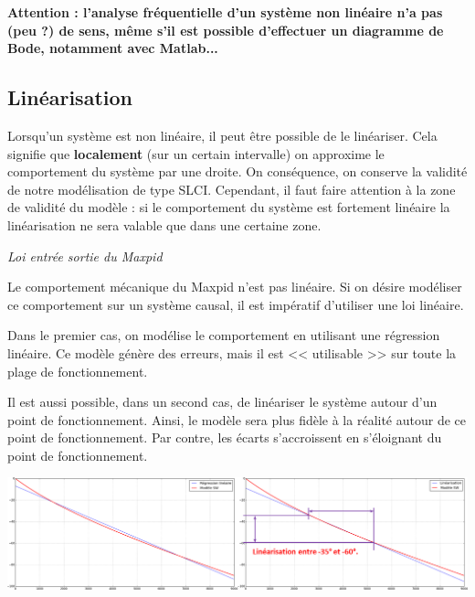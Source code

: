 \documentclass[10pt,fleqn]{article} %
\begin{document}
\textbf{Attention : l'analyse fréquentielle d'un système non linéaire n'a pas (peu ?) de sens, même s'il est possible d'effectuer un diagramme de Bode, notamment avec Matlab...}

\subsection{Linéarisation}
Lorsqu'un système est non linéaire, il peut être possible de le linéariser. Cela signifie que \textbf{localement} (sur un certain intervalle) on approxime le comportement du système par une droite. On conséquence, on conserve la validité de notre modélisation de type SLCI. Cependant, il faut faire attention à la zone de validité du modèle : si le comportement du système est fortement linéaire la linéarisation ne sera valable que dans une certaine zone.

\begin{exemple}
\textit{Loi entrée sortie du Maxpid}

Le comportement mécanique du Maxpid n'est pas linéaire. Si on désire modéliser ce comportement sur un système causal, il est impératif d'utiliser une loi linéaire. 

Dans le premier cas, on modélise le comportement en utilisant une régression linéaire. 
Ce modèle génère des erreurs, mais il est << utilisable >> sur toute la plage de fonctionnement. 

Il est aussi possible, dans un second cas, de linéariser le système autour d'un point de fonctionnement. Ainsi, le modèle sera plus fidèle à la réalité autour de ce point de fonctionnement. Par contre, les écarts s'accroissent en s'éloignant du point de fonctionnement. 

\begin{center}
\includegraphics[width=.9\linewidth]{images/Maxpid_linearisation}
\end{center}


\end{exemple}
\end{document}
